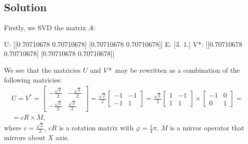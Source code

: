 \documentclass[letterpaper,10pt,english]{jupyterBook}
\begin{document}
\subsection{Solution}
\label{\detokenize{notebooks/ProblemSet1:id4}}
\sphinxAtStartPar
Firstly, we SVD the matrix \(A\):

\begin{sphinxVerbatim}[commandchars=\\\{\}]
  \PYG{p}{[}
    \PYG{p}{[} \PYG{p}{]}
    \PYG{p}{[} \PYG{p}{]}
\PYG{p}{]}

    
 
 
 
\end{sphinxVerbatim}

\begin{sphinxVerbatim}[commandchars=\\\{\}]
U:
 [[\PYGZhy{}0.70710678 \PYGZhy{}0.70710678]
 [\PYGZhy{}0.70710678  0.70710678]]
E: [3. 1.]
V*:
 [[\PYGZhy{}0.70710678 \PYGZhy{}0.70710678]
 [\PYGZhy{}0.70710678  0.70710678]]
\end{sphinxVerbatim}

\sphinxAtStartPar
We see that the matricies \(U\) and \(V*\) may be rewritten as a combination of the following matricies:
\begin{equation*}
\begin{split}
U = V^* = 
\begin{bmatrix}
-\frac{\sqrt{2}}{2} & -\frac{\sqrt{2}}{2}\\
-\frac{\sqrt{2}}{2} & \frac{\sqrt{2}}{2}
\end{bmatrix}
=
\frac{\sqrt{2}}{2}
\begin{bmatrix}
-1 & -1\\
-1 & 1
\end{bmatrix}
=
\frac{\sqrt{2}}{2}
\begin{bmatrix}
1 & -1\\
1 & 1
\end{bmatrix}
\times
\begin{bmatrix}
-1 & 0\\
0 & 1
\end{bmatrix}
=\\
=cR\times M,
\end{split}
\end{equation*}
\sphinxAtStartPar
where \(c = \frac{\sqrt{2}}{2}\), \(cR\) is a rotation matrix with \(\varphi = \frac{1}{4}\pi\), \(M\) is a mirror operator that mirrors about \(X\) axis.
\end{document}
